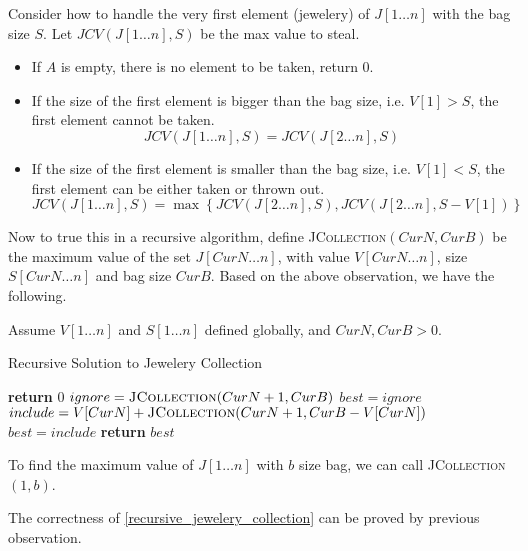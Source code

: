 \begin{homeworkProblem}

    Consider how to handle the very first element (jewelery) of $J[1\ldots n]$ with the bag size $S$. Let $JCV(J[1\ldots n], S)$ be the max value to steal.
\begin{itemize}
    \item If $A$ is empty, there is no element to be taken, return $0$.
    \item If the size of the first element is bigger than the bag size, i.e. $V[1] > S$, the first element cannot be taken.
        \[JCV(J[1\ldots n], S) = JCV(J[2\ldots n], S)\]
    \item If the size of the first element is smaller than the bag size, i.e. $V[1] < S$, the first element can be either taken or thrown out.
        \[JCV(J[1\ldots n], S) = \max\left\{JCV(J[2\ldots n], S), JCV(J[2\ldots n], S - V[1])\right\}\]
\end{itemize}

Now to true this in a recursive algorithm, define \textsc{JCollection}$(CurN, CurB)$
be the maximum value of the set $J[CurN\ldots n]$, with value $V[CurN\ldots n]$,
size $S[CurN\ldots n]$ and bag size $CurB$. Based on the above observation,
we have the following.

Assume $V[1\ldots n]$ and $S[1\ldots n]$ defined globally, and $CurN, CurB > 0$.
\begin{algorithm}[H]
    \caption{Recursive Solution to Jewelery Collection}\label{recursive_jewelery_collection}
    \begin{algorithmic}[1]
                \State \textbf{return }$0$
            \EndIf
            \State $ignore = \text{\textsc{JCollection}}(CurN + 1, CurB)$
            \State $best = ignore$
            \State $include = V[CurN] + \text{\textsc{JCollection}}(CurN + 1, CurB - V[CurN])$
                    \State $best = include$
                \EndIf
            \EndIf
            \State \textbf{return } $best$
        \EndProcedure
    \end{algorithmic}
\end{algorithm}

To find the maximum value of $J[1\ldots n]$ with $b$ size bag, we can call \textsc{JCollection}$(1, b)$.

The correctness of \cref{recursive_jewelery_collection} can be proved by 
previous observation.


\end{homeworkProblem}
